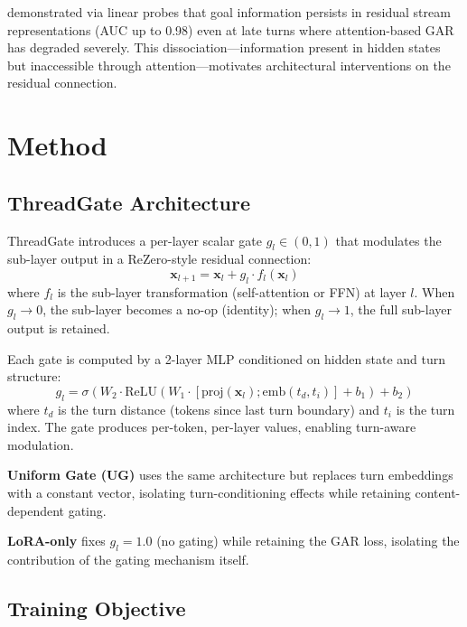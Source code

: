 \documentclass[11pt,a4paper]{article}
\begin{document}
\citet{dongre2026gar} demonstrated via linear probes that goal information persists in residual stream representations (AUC up to 0.98) even at late turns where attention-based GAR has degraded severely. This dissociation---information present in hidden states but inaccessible through attention---motivates architectural interventions on the residual connection.

\section{Method}

\subsection{ThreadGate Architecture}

ThreadGate introduces a per-layer scalar gate $g_l \in (0, 1)$ that modulates the sub-layer output in a ReZero-style residual connection:
\begin{equation}
\mathbf{x}_{l+1} = \mathbf{x}_l + g_l \cdot f_l(\mathbf{x}_l)
\label{eq:gate}
\end{equation}
where $f_l$ is the sub-layer transformation (self-attention or FFN) at layer $l$. When $g_l \to 0$, the sub-layer becomes a no-op (identity); when $g_l \to 1$, the full sub-layer output is retained.

Each gate is computed by a 2-layer MLP conditioned on hidden state and turn structure:
\begin{equation}
g_l = \sigma\!\left(W_2 \cdot \text{ReLU}(W_1 \cdot [\text{proj}(\mathbf{x}_l); \text{emb}(t_d, t_i)] + b_1) + b_2\right)
\end{equation}
where $t_d$ is the turn distance (tokens since last turn boundary) and $t_i$ is the turn index. The gate produces per-token, per-layer values, enabling turn-aware modulation.

\textbf{Uniform Gate (UG)} uses the same architecture but replaces turn embeddings with a constant vector, isolating turn-conditioning effects while retaining content-dependent gating.

\textbf{LoRA-only} fixes $g_l = 1.0$ (no gating) while retaining the GAR loss, isolating the contribution of the gating mechanism itself.

\subsection{Training Objective}
\end{document}
